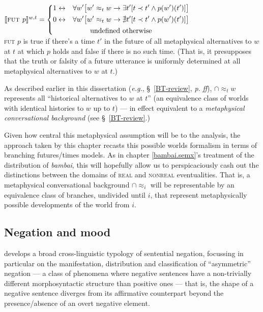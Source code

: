 \pex $ \denote[w,t]{\textsc{fut }p}=\left\{\begin{gathered}\begin{aligned} 1&\leftrightarrow &&\forall w'\big[w'\approx_t w \to\exists t' [t\prec t' \wedge p(w')(t')]\big]\\
0&\leftrightarrow &&\forall w'\big[w'\approx_t w \to\nexists t' [t\prec t' \wedge p(w')(t')]\big]
\end{aligned}\\
\text{undefined otherwise}\end{gathered}\right.
$\\[.5em]
\textsc{fut} $p$ is true if there's a time $ t' $ in the future of all metaphysical alternatives to $ w $ at $ t $ at which $ p $ holds and false if there is no such time. (That is, it presupposes that the truth or falsity of a future utterance is uniformly determined at all metaphysical alternatives to $ w $ at $ t $.)\xe

\noindent As described earlier in this dissertation (\textit{e.g.}, \S~\ref{BT-review}, \textit{p.} \pageref{par:settledness}\textit{ff}), $\cap\!\approx_t\!w $ represents all ``historical alternatives to $ w $ at $ t $'' (an equivalence class of worlds with identical histories to $ w $ up to $ t $) --- in effect equivalent to a \textit{metaphysical conversational background} (see \S~\ref{BT-review}.)


 Given how central this metaphysical assumption will be to the analysis, the approach taken by this chapter recasts this possible worlds formalism in terms of branching futures/times models. As in chapter \ref{bambai.semx}'s treatment of the distribution of \textit{bambai}, this will hopefully allow us to perspicaciously cash out the distinctions between the domains of \textsc{real} and \textsc{nonreal} eventualities. That is, a metaphysical conversational background $ \cap\!\approx_i $ will be representable by an equivalence class of branches, undivided until $ i $, that represent metaphysically possible developments of the world from $ i $.

\subsection{Negation and mood}\label{sec:asymneg}

\citet{Miestamo2005,Miestamo2007} develops a broad cross-linguistic typology of sentential negation, focussing in particular on the manifestation, distribution and classification of ``asymmetric'' negation --- a class of phenomena where negative sentences have a non-trivially different morphosyntactic structure than positive ones --- that is, the shape of a negative sentence diverges from its affirmative counterpart beyond the presence/absence of an overt negative element.

